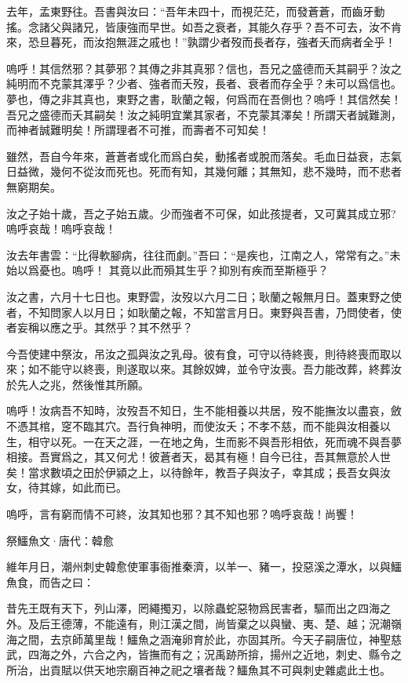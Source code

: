 \documentclass[12pt,a4paper]{ctexbook}
\begin{document}
去年，孟東野往。吾書與汝曰：“吾年未四十，而視茫茫，而發蒼蒼，而齒牙動搖。念諸父與諸兄，皆康強而早世。如吾之衰者，其能久存乎？吾不可去，汝不肯來，恐旦暮死，而汝抱無涯之戚也！”孰謂少者歿而長者存，強者夭而病者全乎！\par
嗚呼！其信然邪？其夢邪？其傳之非其真邪？信也，吾兄之盛德而夭其嗣乎？汝之純明而不克蒙其澤乎？少者、強者而夭歿，長者、衰者而存全乎？未可以爲信也。夢也，傳之非其真也，東野之書，耿蘭之報，何爲而在吾側也？嗚呼！其信然矣！吾兄之盛德而夭其嗣矣！汝之純明宜業其家者，不克蒙其澤矣！所謂天者誠難測，而神者誠難明矣！所謂理者不可推，而壽者不可知矣！\par
雖然，吾自今年來，蒼蒼者或化而爲白矣，動搖者或脫而落矣。毛血日益衰，志氣日益微，幾何不從汝而死也。死而有知，其幾何離；其無知，悲不幾時，而不悲者無窮期矣。\par
汝之子始十歲，吾之子始五歲。少而強者不可保，如此孩提者，又可冀其成立邪?嗚呼哀哉！嗚呼哀哉！\par
汝去年書雲：“比得軟腳病，往往而劇。”吾曰：“是疾也，江南之人，常常有之。”未始以爲憂也。嗚呼！ 其竟以此而殞其生乎？抑別有疾而至斯極乎？\par
汝之書，六月十七日也。東野雲，汝歿以六月二日；耿蘭之報無月日。蓋東野之使者，不知問家人以月日；如耿蘭之報，不知當言月日。東野與吾書，乃問使者，使者妄稱以應之乎。其然乎？其不然乎？\par
今吾使建中祭汝，吊汝之孤與汝之乳母。彼有食，可守以待終喪，則待終喪而取以來；如不能守以終喪，則遂取以來。其餘奴婢，並令守汝喪。吾力能改葬，終葬汝於先人之兆，然後惟其所願。\par
嗚呼！汝病吾不知時，汝歿吾不知日，生不能相養以共居，歿不能撫汝以盡哀，斂不憑其棺，窆不臨其穴。吾行負神明，而使汝夭；不孝不慈，而不能與汝相養以生，相守以死。一在天之涯，一在地之角，生而影不與吾形相依，死而魂不與吾夢相接。吾實爲之，其又何尤！彼蒼者天，曷其有極！自今已往，吾其無意於人世矣！當求數頃之田於伊潁之上，以待餘年，教吾子與汝子，幸其成；長吾女與汝女，待其嫁，如此而已。\par
嗚呼，言有窮而情不可終，汝其知也邪？其不知也邪？嗚呼哀哉！尚饗！\par
祭鱷魚文·唐代：韓愈 \par
維年月日，潮州刺史韓愈使軍事衙推秦濟，以羊一、豬一，投惡溪之潭水，以與鱷魚食，而告之曰：\par
昔先王既有天下，列山澤，罔繩擉刃，以除蟲蛇惡物爲民害者，驅而出之四海之外。及后王德薄，不能遠有，則江漢之間，尚皆棄之以與蠻、夷、楚、越；況潮嶺海之間，去京師萬里哉！鱷魚之涵淹卵育於此，亦固其所。今天子嗣唐位，神聖慈武，四海之外，六合之內，皆撫而有之；況禹跡所揜，揚州之近地，刺史、縣令之所治，出貢賦以供天地宗廟百神之祀之壤者哉？鱷魚其不可與刺史雜處此土也。\par
\end{document}
